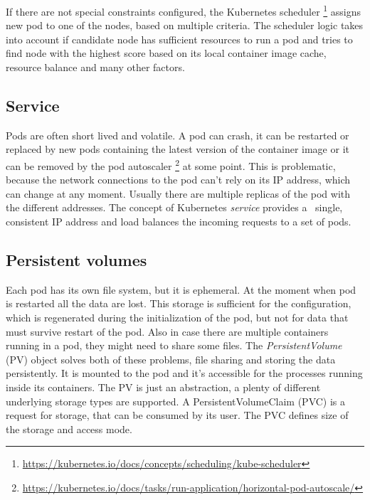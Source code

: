 \documentclass[
  digital, %
  twoside, %
  table,   %
  lof,     %
  lot,     %
]{fithesis3}
\begin{document}
If there are not special constraints configured, the Kubernetes scheduler \footnote{\url{https://kubernetes.io/docs/concepts/scheduling/kube-scheduler}} assigns new pod to one of the nodes, based on multiple criteria. The scheduler logic takes into account if candidate node has sufficient resources to run a pod and tries to find node with the highest score based on its local container image cache, resource balance and many other factors.

\subsection{Service} \label{sec:service}
Pods are often short lived and volatile. A pod can crash, it can be restarted or replaced by new pods containing the latest version of the container image or it can be removed by the pod autoscaler \footnote{\url{https://kubernetes.io/docs/tasks/run-application/horizontal-pod-autoscale/}} at some point. This is problematic, because the network connections to the pod can't rely on its IP address, which can change at any moment. Usually there are multiple replicas of the pod with the different addresses. The concept of Kubernetes \textit{service} provides a \
single, consistent IP address and load balances the incoming requests to a set of pods.

\subsection{Persistent volumes} \label{sec:persistent-volume}
Each pod has its own file system, but it is ephemeral. At the moment when pod is restarted all the data are lost. This storage is sufficient for the configuration, which is regenerated during the initialization of the pod, but not for data that must survive restart of the pod. Also in case there are multiple containers running in a pod, they might need to share some files. The \textit{PersistentVolume} (PV) object solves both of these problems, file sharing and storing the data persistently. It is mounted to the pod and it's accessible for the processes running inside its containers. The PV is just an abstraction, a plenty of different underlying storage types are supported. A PersistentVolumeClaim (PVC) is a request for storage, that can be consumed by its user. The PVC defines size of the storage and access mode.
\end{document}
